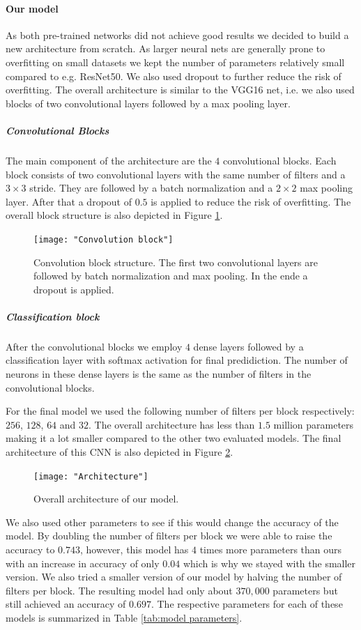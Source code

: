 \documentclass{article}
\begin{document}
\paragraph{Our model} As both pre-trained networks did not achieve good results we decided to build a new architecture from scratch. As larger neural nets are generally prone to overfitting on small datasets we kept the number of parameters relatively small compared to e.g. ResNet50. We also used dropout to further reduce the risk of overfitting. The overall architecture is similar to the VGG16 net, i.e. we also used blocks of two convolutional layers followed by a max pooling layer.

\subparagraph{Convolutional Blocks} The main component of the architecture are the $4$ convolutional blocks. Each block consists of two convolutional layers with the same number of filters and a $3 \times 3$ stride. They are followed by a batch normalization and a $2 \times 2$ max pooling layer. After that a dropout of $0.5$ is applied to reduce the risk of overfitting. The overall block structure is also depicted in Figure \ref{fig:convolution block}.

\begin{figure}
  \centering
  \texttt{[image: "Convolution block"]}  
  \caption{Convolution block structure. The first two convolutional layers are followed by batch normalization and max pooling. In the ende a dropout is applied.}
  \label{fig:convolution block}
\end{figure}

\subparagraph{Classification block} After the convolutional blocks we employ $4$ dense layers followed by a classification layer with softmax activation for final predidiction. The number of neurons in these dense layers is the same as the number of filters in the convolutional blocks.

For the final model we used the following number of filters per block respectively: $256$, $128$, $64$ and $32$. The overall architecture has less than $1.5$ million parameters making it a lot smaller compared to the other two evaluated models. The final architecture of this CNN is also depicted in Figure \ref{fig:architecture}.

\begin{figure}
  \centering
  \texttt{[image: "Architecture"]}  
  \caption{Overall architecture of our model.}
  \label{fig:architecture}
\end{figure}

We also used other parameters to see if this would change the accuracy of the model. By doubling the number of filters per block we were able to raise the accuracy to $0.743$, however, this model has $4$ times more parameters than ours with an increase in accuracy of only $0.04$ which is why we stayed with the smaller version. We also tried a smaller version of our model by halving the number of filters per block. The resulting model had only about $370,000$ parameters but still achieved an accuracy of $0.697$. The respective parameters for each of these models is summarized in Table \ref{tab:model parameters}.
\end{document}
